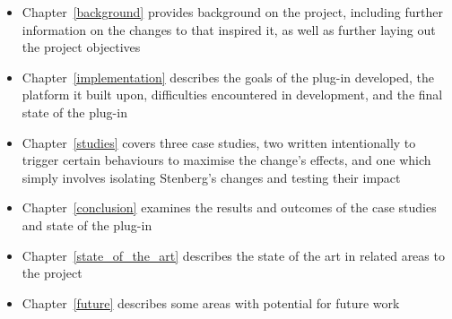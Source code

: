 \begin{itemize}
	\item{Chapter~\ref{background} provides background on the project, including further information on the changes to  that inspired it, as well as further laying out the project objectives}
	\item{Chapter~\ref{implementation} describes the goals of the plug-in developed, the platform it built upon, difficulties encountered in development, and the final state of the plug-in}
	\item{Chapter~\ref{studies} covers three case studies, two written intentionally to trigger certain behaviours to maximise the change's effects, and one which simply involves isolating Stenberg's changes and testing their impact}
	\item{Chapter~\ref{conclusion} examines the results and outcomes of the case studies and state of the plug-in}
	\item{Chapter~\ref{state_of_the_art} describes the state of the art in related areas to the project}
	\item{Chapter~\ref{future} describes some areas with potential for future work}
\end{itemize}
